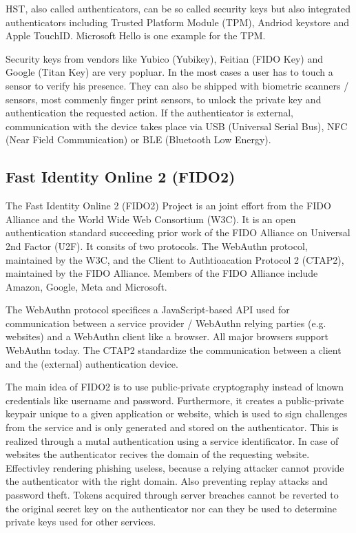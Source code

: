 \documentclass[runningheads]{llncs}
\begin{document}
HST, also called authenticators, can be so called security keys but also integrated authenticators including Trusted Platform Module (TPM), Andriod keystore and Apple TouchID. Microsoft Hello is one example for the TPM.

Security keys from vendors like Yubico (Yubikey), Feitian (FIDO Key) and Google (Titan Key) are very popluar. In the most cases a user has to touch a sensor to verify his presence. They can also be shipped with biometric scanners / sensors, most commenly finger print sensors, to unlock the private key and authentication the requested action. If the authenticator is external, communication with the device takes place via USB (Universal Serial Bus), NFC (Near Field Communication) or BLE (Bluetooth Low Energy).\cite{9152694}

\subsection{Fast Identity Online 2 (FIDO2)}
The Fast Identity Online 2 (FIDO2) Project is an joint effort from the FIDO Alliance and the World Wide Web Consortium (W3C). It is an open authentication standard succeeding prior work of the FIDO Alliance on Universal 2nd Factor (U2F). \cite{9152694}  It consits of two protocols. The WebAuthn protocol, maintained by the W3C, and the Client to Authtioacation Protocol 2 (CTAP2), maintained by the FIDO Alliance. Members of the FIDO Alliance include Amazon, Google, Meta and Microsoft.

The WebAuthn protocol specifices a JavaScript-based API used for
communication between a service provider / WebAuthn relying parties (e.g. websites) and a WebAuthn client like a browser. All major browsers support WebAuthn today.\cite{000001}
The CTAP2 standardize the communication between a client and the (external) authentication device.\cite{274547}\cite{9099190}

The main idea of FIDO2 is to use public-private cryptography instead of known credentials like username and password. Furthermore, it creates a public-private keypair unique to a given application or website, which is used to sign challenges from the service and is only generated and stored on the authenticator. This is realized through a mutal authentication using a service identificator. In case of websites the authenticator recives the domain of the requesting website. Effectivley rendering phishing useless, because a relying attacker cannot provide the authenticator with the right domain.\cite{274610} Also preventing replay attacks and password theft. Tokens acquired through server breaches cannot be reverted to the original secret key on the authenticator nor can they be used to determine private keys used for other services.
\end{document}
